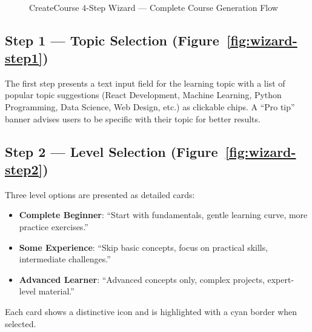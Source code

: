 \documentclass[12pt,a4paper]{report}
\begin{document}
\begin{figure}[H]
    \centering
        \centering
        \caption{Step 1 --- Topic Selection}
        \label{fig:wizard-step1}
    \hfill
        \centering
        \caption{Step 2 --- Level Selection}
        \label{fig:wizard-step2}
    \\[0.5cm]
        \centering
        \caption{Step 3 --- Time Commitment}
        \label{fig:wizard-step3}
    \hfill
        \centering
        \caption{Step 4 --- Review \& Generate}
        \label{fig:wizard-step4}
    \caption{CreateCourse 4-Step Wizard --- Complete Course Generation Flow}
    \label{fig:create-wizard}
\end{figure}

\subsection{Step 1 --- Topic Selection (Figure~\ref{fig:wizard-step1})}
The first step presents a text input field for the learning topic with a list of popular topic suggestions (React Development, Machine Learning, Python Programming, Data Science, Web Design, etc.) as clickable chips. A ``Pro tip'' banner advises users to be specific with their topic for better results.

\subsection{Step 2 --- Level Selection (Figure~\ref{fig:wizard-step2})}
Three level options are presented as detailed cards:
\begin{itemize}[noitemsep]
    \item \textbf{Complete Beginner}: ``Start with fundamentals, gentle learning curve, more practice exercises.''
    \item \textbf{Some Experience}: ``Skip basic concepts, focus on practical skills, intermediate challenges.''
    \item \textbf{Advanced Learner}: ``Advanced concepts only, complex projects, expert-level material.''
\end{itemize}
Each card shows a distinctive icon and is highlighted with a cyan border when selected.
\end{document}
